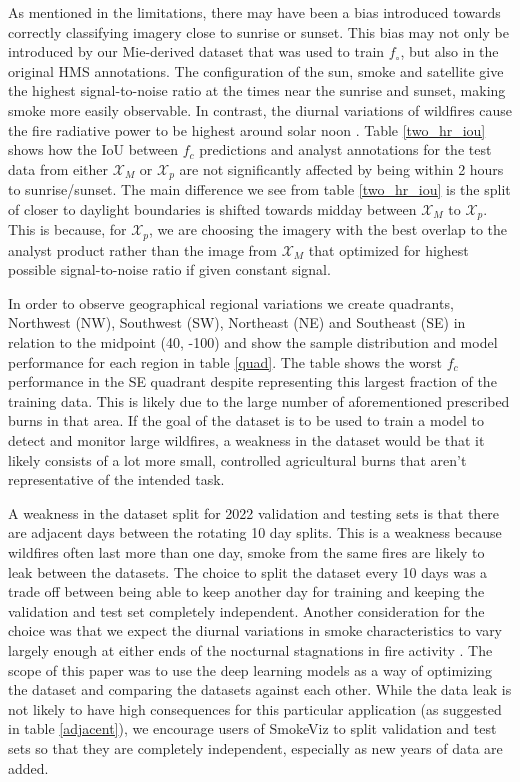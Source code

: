\documentclass{article}
\begin{document}
As mentioned in the limitations, there may have been a bias introduced towards correctly classifying imagery close to sunrise or sunset. This bias may not only be introduced by our Mie-derived dataset that was used to train \(f_{\circ}\), but also in the original HMS annotations. The configuration of the sun, smoke and satellite give the highest signal-to-noise ratio at the times near the sunrise and sunset, making smoke more easily observable. In contrast, the diurnal variations of wildfires cause the fire radiative power to be highest around solar noon \cite{diurnal}. Table \ref{two_hr_iou} shows how the IoU between \(f_c\) predictions and analyst annotations for the test data from either \(\mathcal{X}_M\) or \(\mathcal{X}_p\) are not significantly affected by being within 2 hours to sunrise/sunset. The main difference we see from table \ref{two_hr_iou} is the split of closer to daylight boundaries is shifted towards midday between \(\mathcal{X}_M\) to \(\mathcal{X}_p\). This is because, for \(\mathcal{X}_p\), we are choosing the imagery with the best overlap to the analyst product rather than the image from \(\mathcal{X}_M\) that optimized for highest possible signal-to-noise ratio if given constant signal.


In order to observe geographical regional variations we create quadrants, Northwest (NW), Southwest (SW), Northeast (NE) and Southeast (SE) in relation to the midpoint (40, -100) and show the sample distribution and model performance for each region in table \ref{quad}. The table shows the worst \(f_c\) performance in the SE quadrant despite representing this largest fraction of the training data. This is likely due to the large number of aforementioned prescribed burns in that area. If the goal of the dataset is to be used to train a model to detect and monitor large wildfires, a weakness in the dataset would be that it likely consists of a lot more small, controlled agricultural burns that aren't representative of the intended task. 

A weakness in the dataset split for 2022 validation and testing sets is that there are adjacent days between the rotating 10 day splits. This is a weakness because wildfires often last more than one day, smoke from the same fires are likely to leak between the datasets. The choice to split the dataset every 10 days was a trade off between being able to keep another day for training and keeping the validation and test set completely independent. Another consideration for the choice was that we expect the diurnal variations in smoke characteristics to vary largely enough at either ends of the nocturnal stagnations in fire activity \cite{night}. The scope of this paper was to use the deep learning models as a way of optimizing the dataset and comparing the datasets against each other. While the data leak is not likely to have high consequences for this particular application (as suggested in table \ref{adjacent}), we encourage users of SmokeViz to split validation and test sets so that they are completely independent, especially as new years of data are added. 
\end{document}

